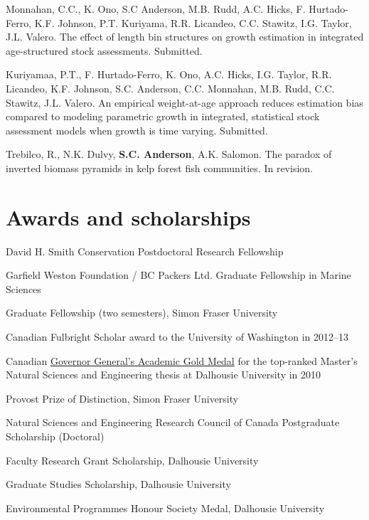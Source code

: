 \begin{description}
\itemsep3pt\parskip0pt
\item[2015]
Monnahan, C.C., K. Ono, S.C Anderson, M.B. Rudd, A.C. Hicks, F.
Hurtado-Ferro, K.F. Johnson, P.T. Kuriyama, R.R. Licandeo, C.C. Stawitz,
I.G. Taylor, J.L. Valero. The effect of length bin structures on growth
estimation in integrated age-structured stock assessments. Submitted.
\item[2015]
Kuriyamaa, P.T., F. Hurtado-Ferro, K. Ono, A.C. Hicks, I.G. Taylor, R.R.
Licandeo, K.F. Johnson, S.C. Anderson, C.C. Monnahan, M.B. Rudd, C.C.
Stawitz, J.L. Valero. An empirical weight-at-age approach reduces
estimation bias compared to modeling parametric growth in integrated,
statistical stock assessment models when growth is time varying.
Submitted.
\item[2015]
Trebilco, R., N.K. Dulvy, \textbf{S.C. Anderson}, A.K. Salomon. The
paradox of inverted biomass pyramids in kelp forest fish communities. In
revision.
\end{description}

\section{Awards and scholarships}\label{awards-and-scholarships}

\begin{description}
\itemsep3pt\parskip0pt
\item[2015]
David H. Smith Conservation Postdoctoral Research Fellowship
\item[2014]
Garfield Weston Foundation / BC Packers Ltd. Graduate Fellowship in
Marine Sciences
\item[2014]
Graduate Fellowship (two semesters), Simon Fraser University
\item[2012--13]
Canadian Fulbright Scholar award to the University of Washington in
2012--13
\item[2011]
Canadian \href{http://goo.gl/nA1zE}{Governor General's Academic Gold
Medal} for the top-ranked Master's Natural Sciences and Engineering
thesis at Dalhousie University in 2010
\item[2011--14]
Provost Prize of Distinction, Simon Fraser University
\item[2011--14]
Natural Sciences and Engineering Research Council of Canada Postgraduate
Scholarship (Doctoral)
\item[2007--10]
Faculty Research Grant Scholarship, Dalhousie University
\item[2007--09]
Graduate Studies Scholarship, Dalhousie University
\item[2007]
Environmental Programmes Honour Society Medal, Dalhousie University
\end{description}

